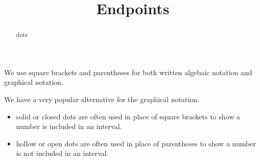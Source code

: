 \documentclass{ximera}
\title{Endpoints}
\begin{document}
\begin{abstract}
dots
\end{abstract}
\maketitle



We use square brackets and parentheses for both written algebaic notation and graphical notation.  


We have a very popular alternative for the graphical notation. 


\begin{itemize}
    \item solid or closed dots are often used in place of square brackets to show a number is included in an interval.
    \item hollow or open dots are often used in place of parentheses to show a number is not included in an interval.
\end{itemize}
\end{document}
